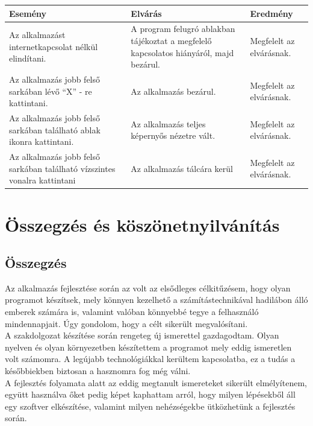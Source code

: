 \documentclass[a4paper,12pt]{report}
\begin{document}
\begin{center}
    \begin{tabular}{ | m{4.5cm} | m{4.5cm} | m{4.5cm} |}
        \hline
        Esemény & Elvárás & Eredmény \\ \hline
        Az alkalmazást internetkapcsolat nélkül elindítani. & A program felugró ablakban tájékoztat a megfelelő kapcsolatos hiányáról,
        majd bezárul. & Megfelelt az elvárásnak.\\ \hline
        Az alkalmazás jobb felső sarkában lévő ``X'' - re kattintani. & Az alkalmazás bezárul. & Megfelelt az elvárásnak.\\ \hline
        Az alkalmazás jobb felső sarkában található ablak ikonra kattintani. & Az alkalmazás teljes képernyős nézetre vált. &
        Megfelelt az elvárásnak.\\ \hline
        Az alkalmazás jobb felső sarkában található vízszintes vonalra kattintani & Az alkalmazás tálcára kerül & Megfelelt az elvárásnak.\\ \hline
        \hline
    \end{tabular}
\end{center}

\chapter{Összegzés és köszönetnyilvánítás}

\section{Összegzés}
    Az alkalmazás fejlesztése során az volt az elsődleges célkitűzésem, hogy olyan programot készítsek, mely könnyen kezelhető
    a számítástechnikával hadilábon álló emberek számára is, valamint valóban könnyebbé tegye a felhasználó mindennapjait. Úgy
    gondolom, hogy a célt sikerült megvalósítani.\\
    A szakdolgozat készítése során rengeteg új ismerettel gazdagodtam. Olyan nyelven és olyan környezetben készítettem a programot
    mely eddig ismeretlen volt számomra. A legújabb technológiákkal kerültem kapcsolatba, ez a tudás a későbbiekben biztosan
    a hasznomra fog még válni.\\
    A fejlesztés folyamata alatt az eddig megtanult ismereteket sikerült elmélyítenem, együtt használva őket pedig képet kaphattam
    arról, hogy milyen lépésekből áll egy szoftver elkészítése, valamint milyen nehézségekbe ütközhetünk a fejlesztés során.
\end{document}
